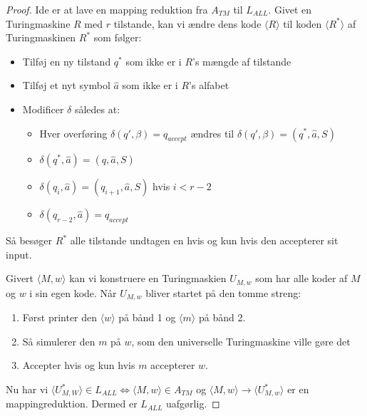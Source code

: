 \begin{proof}
	Ide er at lave en mapping reduktion fra $A_{TM}$ til $L_{ALL}$. Givet en Turingmaskine $R$ med $r$ tilstande, kan vi ændre dens kode $\langle R \rangle$ til koden $\langle R^{*} \rangle $ af Turingmaskinen $R^{*}$ som følger:
	\begin{itemize}
		\item Tilføj en ny tilstand $q^{*}$ som ikke er i $R$'s mængde af tilstande
		\item Tilføj et nyt symbol $\hat{a}$ som ikke er i $R$'s alfabet
		\item Modificer $\delta$ således at:
		      \begin{itemize}
			      \item Hver overføring $\delta(q', \beta) = q_{accept}$ ændres til $\delta(q', \beta) = (q^{*}, \hat{a},S)$
			      \item $\delta(q^{*}, \hat{a}) = (q, \hat{a}, S)$
			      \item \(\delta(q_{i}, \hat{a}) = (q_{i+1}, \hat{a}, S)\) hvis $i < r -2$
			      \item $\delta(q_{r-2}, \hat{a}) = q_{accept}$
		      \end{itemize}
	\end{itemize}

	Så besøger $R^{*}$ alle tilstande undtagen en hvis og kun hvis den accepterer sit input.

	Givert $\langle M , w \rangle $ kan vi konstruere en Turingmaskien $U_{M,w}$ som har alle koder af $M$ og $w$ i sin egen kode. Når $U_{M,w}$ bliver startet på den tomme streng:

	\begin{enumerate}
		\item Først printer den \(\langle w \rangle \) på bånd 1 og \(\langle m \rangle \) på bånd 2.
		\item Så simulerer den $m$ på $w$, som den universelle Turingmaskine ville gøre det
		\item Accepter hvis og kun hvis $m$ accepterer $w$.
	\end{enumerate}

	Nu har vi $\langle U^{*}_{M,W} \rangle \in L_{ALL} \iff \langle M, w \rangle \in A_{TM}$ og $\langle M , w \rangle \longrightarrow \langle U^{*}_{M,w} \rangle $ er en mappingreduktion. Dermed er $L_{ALL}$ uafgørlig.

\end{proof}





